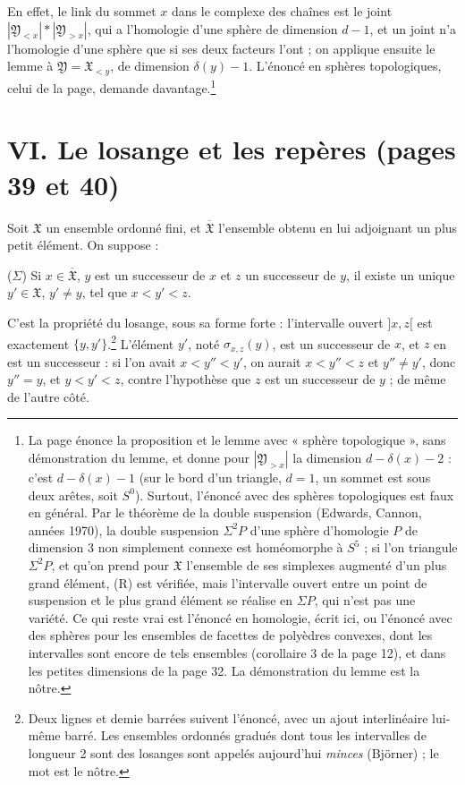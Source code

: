 \documentclass[11pt,a4paper]{article}
\begin{document}
En effet, le link du sommet $x$ dans le complexe des chaînes est le joint
$|\mathfrak{Y}_{<x}| * |\mathfrak{Y}_{>x}|$, qui a l'homologie d'une sphère de
dimension $d - 1$, et un joint n'a l'homologie d'une sphère que si ses deux
facteurs l'ont ; on applique ensuite le lemme à $\mathfrak{Y} = \mathfrak{X}_{<y}$,
de dimension $\delta(y) - 1$. L'énoncé en sphères topologiques, celui de la
page, demande davantage.\footnote{La page énonce la proposition et le lemme avec « sphère
topologique », sans démonstration du lemme, et donne pour $|\mathfrak{Y}_{>x}|$
la dimension $d - \delta(x) - 2$ : c'est $d - \delta(x) - 1$ (sur le bord d'un
triangle, $d = 1$, un sommet est sous deux arêtes, soit $S^{0}$). Surtout,
l'énoncé avec des sphères topologiques est faux en général. Par le théorème de
la double suspension (Edwards, Cannon, années 1970), la double suspension
$\Sigma^{2} P$ d'une sphère d'homologie $P$ de dimension 3 non simplement
connexe est homéomorphe à $S^{5}$ ; si l'on triangule $\Sigma^{2} P$, et qu'on
prend pour $\mathfrak{X}$ l'ensemble de ses simplexes augmenté d'un plus grand
élément, (R) est vérifiée, mais l'intervalle ouvert entre un point de
suspension et le plus grand élément se réalise en $\Sigma P$, qui n'est pas une
variété. Ce qui reste vrai est l'énoncé en homologie, écrit ici, ou l'énoncé
avec des sphères pour les ensembles de facettes de polyèdres convexes, dont les
intervalles sont encore de tels ensembles (corollaire 3 de la page 12), et dans
les petites dimensions de la page 32. La démonstration du lemme est la nôtre.}

\section*{VI. Le losange et les repères (pages 39 et 40)}

Soit $\mathfrak{X}$ un ensemble ordonné fini, et $\overline{\mathfrak{X}}$
l'ensemble obtenu en lui adjoignant un plus petit élément. On suppose :

($\Sigma$) Si $x \in \overline{\mathfrak{X}}$, $y$ est un successeur de $x$ et $z$
un successeur de $y$, il existe un unique $y' \in \mathfrak{X}$, $y' \neq y$, tel
que $x < y' < z$.

C'est la propriété du losange, sous sa forme forte : l'intervalle ouvert
$]x, z[$ est exactement $\{y, y'\}$.\footnote{Deux lignes et demie barrées
suivent l'énoncé, avec un ajout interlinéaire lui-même barré. Les ensembles
ordonnés gradués dont tous les intervalles de longueur 2 sont des losanges sont
appelés aujourd'hui \emph{minces} (Björner) ; le mot est le nôtre.} L'élément
$y'$, noté $\sigma_{x,z}(y)$, est un successeur de $x$, et $z$ en est un
successeur : si l'on avait $x < y'' < y'$, on aurait $x < y'' < z$ et
$y'' \neq y'$, donc $y'' = y$, et $y < y' < z$, contre l'hypothèse que $z$ est
un successeur de $y$ ; de même de l'autre côté.
\end{document}
